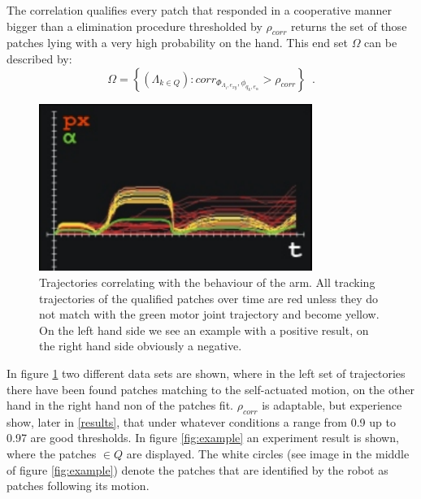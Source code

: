 \documentclass[conference]{IEEEtran}
\begin{document}
The correlation qualifies every patch that responded in a cooperative manner bigger than a elimination procedure thresholded by $\rho_{corr}$ returns the set of those patches lying with a very high probability on the hand. This end set $\Omega$ can be described by:
%
\begin{equation}
\label{endset}
 \Omega = \left\lbrace \left( \Lambda_{k \in Q} \right): corr_{\Phi_{\Lambda_{i}, e_{xy}}, \phi_{q_{k}, e_{\alpha}}} > \rho_{corr} \right\rbrace \enspace .
\end{equation}
%
\begin{figure}[h]
	\begin{center}
		\includegraphics[width=3.5in]{imgs/method/correlation.pdf}
		\caption[Trajectories correlating with the behaviour of the arm. ]{Trajectories correlating with the behaviour of the arm. All tracking trajectories of the qualified patches over time are red unless they do not match with the green motor joint trajectory and become yellow. On the left hand side we see an example with a positive result, on the right hand side obviously a negative.}
		\label{fig:corr}
	\end{center}
\end{figure}
%
In figure \ref{fig:corr} two different data sets are shown, where in the left set of trajectories there have been found patches matching to the self-actuated motion, on the other hand in the right hand non of the patches fit. $\rho_{corr}$ is adaptable, but experience show, later in \ref{results}, that under whatever conditions a range from 0.9 up to 0.97 are good thresholds. In figure \ref{fig:example} an experiment result is shown, where the patches $\in Q$ are displayed. The white circles (see image in the middle of figure \ref{fig:example}) denote the patches that are identified by the robot as patches following its motion.
%
\end{document}

